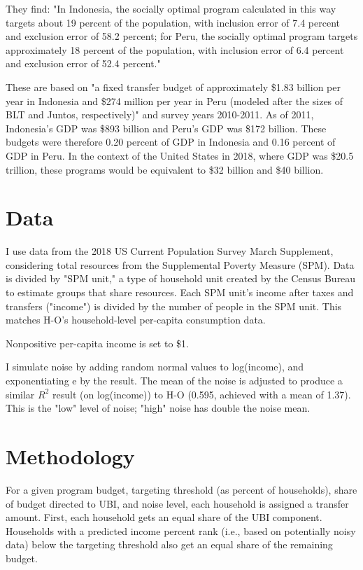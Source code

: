 \documentclass[12pt]{article}
\begin{document}
They find: "In Indonesia, the socially optimal program calculated in this way 
targets about 19 percent of the population, with inclusion error of 7.4 percent 
and exclusion error of 58.2 percent; for Peru, the socially optimal program 
targets approximately 18 percent of the population, with inclusion error of 6.4 
percent and exclusion error of 52.4 percent."

These are based on "a fixed transfer budget of approximately \$1.83 billion per 
year in Indonesia and \$274 million per year in Peru (modeled after the sizes 
of BLT and Juntos, respectively)" and survey years 2010-2011. As of 2011, 
Indonesia's GDP was \$893 billion and Peru's GDP was \$172 billion. These 
budgets were therefore 0.20 percent of GDP in Indonesia and 0.16 percent of GDP 
in Peru. In the context of the United States in 2018, where GDP was \$20.5 
trillion, these programs would be equivalent to \$32 billion and \$40 billion.


\section{Data} \label{sec:data}

I use data from the 2018 US Current Population Survey March Supplement, 
considering total resources from the Supplemental Poverty Measure (SPM). Data 
is divided by "SPM unit," a type of household unit created by the Census Bureau 
to estimate groups that share resources. Each SPM unit's income after taxes and 
transfers ("income") is divided by the number of people in the SPM unit. This 
matches H-O's household-level per-capita consumption data.

Nonpositive per-capita income is set to \$1.

I simulate noise by adding random normal values to log(income), and 
exponentiating e by the result. The mean of the noise is adjusted to produce a 
similar $R^2$ result (on log(income)) to H-O (0.595, achieved with a mean of 
1.37). This is the "low" level of noise; "high" noise has double the noise mean.


\section{Methodology} \label{sec:methodology}

For a given program budget, targeting threshold (as percent of households), 
share of budget directed to UBI, and noise level, each household is assigned a 
transfer amount. First, each household gets an equal share of the UBI 
component. Households with a predicted income percent rank (i.e., based on 
potentially noisy data) below the targeting threshold also get an equal share 
of the remaining budget.
\end{document}

